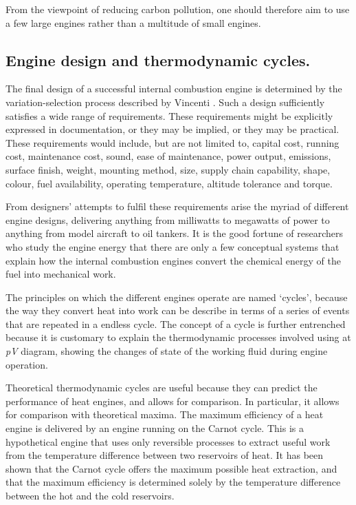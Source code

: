From the viewpoint of reducing carbon pollution, one should therefore aim to use
a few large engines rather than a multitude of small engines.

\subsection{Engine design and thermodynamic cycles.} \label{par:efficiency}

The final design of a successful internal combustion engine is determined by the
variation-selection process described by Vincenti \autocite{Vincenti1990}. Such
a design sufficiently satisfies a wide range of requirements. These requirements
might be explicitly expressed in documentation, or they may be implied, or they
may be practical. These requirements would include, but are not limited to,
capital cost, running cost, maintenance cost, sound, ease of maintenance, power
output, emissions, surface finish, weight, mounting method, size, supply chain
capability, shape, colour, fuel availability, operating temperature, altitude
tolerance and torque.

From designers' attempts to fulfil these requirements arise the myriad of
different engine designs, delivering anything from milliwatts to megawatts of
power to anything from model aircraft to oil tankers. It is the good fortune of
researchers who study the engine energy that there are only a few conceptual
systems that explain how the internal combustion engines convert the chemical
energy of the fuel into mechanical work.

The principles on which the different engines operate are named `cycles',
because the way they convert heat into work can be describe in terms of a series
of events that are repeated in a endless cycle. The concept of a cycle is
further entrenched because it is customary to explain the thermodynamic
processes involved using at \textit{pV} diagram, showing the changes of state of
the working fluid during engine operation.

Theoretical thermodynamic cycles are useful because they can predict the
performance of heat engines, and allows for comparison. In particular, it allows
for comparison with theoretical maxima. The maximum efficiency of a heat engine
is delivered by an engine running on the Carnot cycle. This is a hypothetical
engine that uses only reversible processes to extract useful work from the
temperature difference between two reservoirs of heat. It has been shown that
the Carnot cycle offers the maximum possible heat extraction, and that the
maximum efficiency is determined solely by the temperature difference between
the hot and the cold reservoirs.

